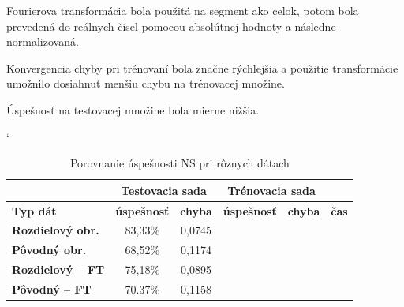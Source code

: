 Fourierova transformácia bola použitá na segment ako celok, potom bola prevedená do reálnych čísel pomocou absolútnej hodnoty a následne normalizovaná.

Konvergencia chyby pri trénovaní bola značne rýchlejšia a použitie transformácie umožnilo dosiahnuť menšiu chybu na trénovacej množine.

Úspešnosť na testovacej množine bola mierne nižšia.
% 

\begin{table}[h]
\catcode` %
\centering
\begin{tabular}{|l|c|c|c|c|c|}
\cline{2-5}
\multicolumn{1}{l}{} & \multicolumn{2}{|c|}{\textbf{Testovacia sada}} & \multicolumn{2}{c|}{\textbf{Trénovacia sada}} & \multicolumn{1}{l}{}\\ 
\hline
\textbf{Typ dát} & \textbf{úspešnosť} & \textbf{chyba} & \textbf{úspešnosť} & \textbf{chyba} & \textbf{čas} \\ \hline
\textbf{Rozdielový obr.} & 83,33\% & 0,0745 & & & \\ \hline
\textbf{Pôvodný obr.} & 68,52\% & 0,1174& & &\\ \hline
\textbf{Rozdielový -- FT} & 75,18\%& 0,0895& & &\\ \hline
\textbf{Pôvodný -- FT} & 70.37\%& 0,1158& & &\\
\hline
\end{tabular}
\caption{Porovnanie úspešnosti NS pri rôznych dátach}
\label{tab:neuraldatacmp}
\end{table}